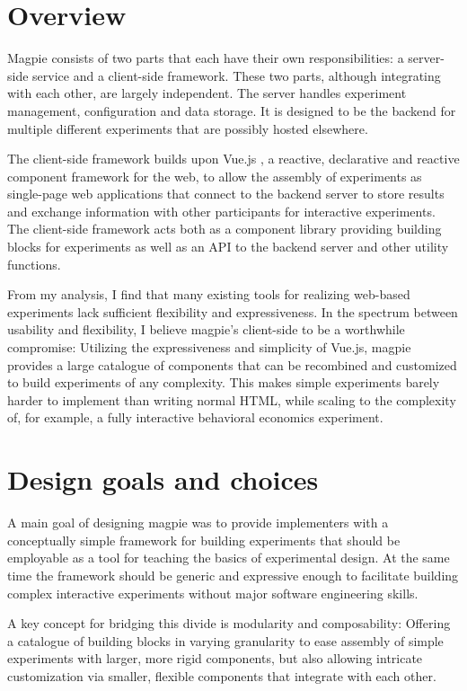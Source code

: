 \documentclass[a4paper,11pt]{scrreprt}
\begin{document}
\section{Overview}
Magpie consists of two parts that each have their own responsibilities: a server-side service and a client-side framework. These two parts, although integrating with each other, are largely independent. The server handles experiment management, configuration and data storage. It is designed to be the backend for multiple different experiments that are possibly hosted elsewhere.

The client-side framework builds upon Vue.js \citep{You2014}, a reactive, declarative and reactive component framework for the web, to allow the assembly of experiments as single-page web applications that connect to the backend server to store results and exchange information with other participants for interactive experiments. The client-side framework acts both as a component library providing building blocks for experiments as well as an API to the backend server and other utility functions.

From my analysis, I find that many existing tools for realizing web-based experiments lack sufficient flexibility and expressiveness. In the spectrum between usability and flexibility, I believe magpie's client-side to be a worthwhile compromise: Utilizing the expressiveness and simplicity of Vue.js, magpie provides a large catalogue of components that can be recombined and customized to build experiments of any complexity. This makes simple experiments barely harder to implement than writing normal HTML, while scaling to the complexity of, for example, a fully interactive behavioral economics experiment.

\section{Design goals and choices}
A main goal of designing magpie was to provide implementers with a conceptually simple framework for building experiments that should be employable as a tool for teaching the basics of experimental design. At the same time the framework should be generic and expressive enough to facilitate building complex interactive experiments without major software engineering skills.

A key concept for bridging this divide is modularity and composability: Offering a catalogue of building blocks in varying granularity to ease assembly of simple experiments with larger, more rigid components, but also allowing intricate customization via smaller, flexible components that integrate with each other.
\end{document}
